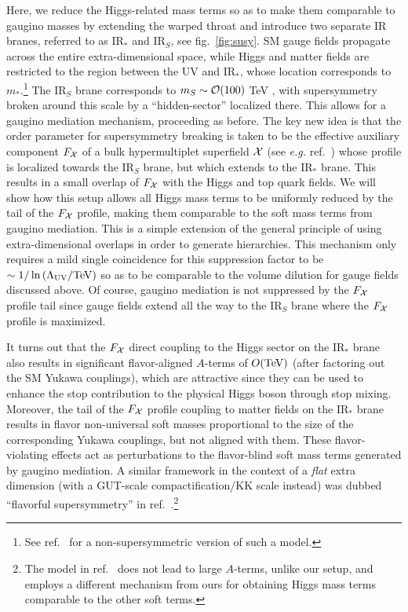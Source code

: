 \documentclass[a4paper,12pt]{article}
\def\fig#1{fig.~\ref{#1}}
\def\fig#1{fig.~\ref{#1}}
\def\LUV{\Lambda_{\rm UV}}
\def\mst{m_*}
\def\mS{m_S}
\begin{document}
Here, we reduce the Higgs-related mass terms so as to make them comparable to gaugino masses by extending the warped throat and introduce two separate IR branes, referred to as IR$_*$ and IR$_S$, see \fig{fig:susy}. SM gauge fields propagate across the entire extra-dimensional space, while Higgs and matter fields are restricted to the region between the UV and IR$_*$, whose location corresponds to
$\mst$.\footnote{See ref.~\cite{Agashe:2016rle} for a non-supersymmetric version of such a model.}
The IR$_S$ brane corresponds to $\mS \sim {\cal O}(100)$ TeV , with supersymmetry broken around this scale by a ``hidden-sector'' localized there. This allows for a gaugino mediation mechanism, proceeding as before.
The 
key new idea is that the order parameter for supersymmetry breaking is taken to be the effective auxiliary component $F_{\cal X}$  of a bulk hypermultiplet superfield ${\cal X}$ (see {\it e.g.} ref.~\cite{Arkani-Hamed:2001vvu}) whose  profile 
 is localized towards the IR$_S$ brane, 
but which extends to the IR$_*$ brane. This results in a small overlap of $F_{\cal X}$ 
with the Higgs and top quark fields.
We will show how this setup allows all Higgs mass terms to be uniformly reduced by the tail of the $F_{\cal X}$ profile, 
making them 
comparable to the soft mass terms from gaugino mediation. 
This is a simple extension of the general principle of using extra-dimensional overlaps in order to 
generate hierarchies.
This mechanism only requires a mild single coincidence for this suppression factor to be 
$\sim 1 / \ln \left( \LUV / \hbox{TeV} \right)$ so as to be comparable to the volume dilution for 
gauge fields discussed above.
Of course, 
gaugino mediation is not suppressed by the $F_{\cal X}$ profile tail since gauge fields extend all
 the way to the IR$_S$ brane where the $F_{\cal X}$ profile is maximized.

It turns out that the $F_{\cal X}$ direct coupling to the Higgs sector on the IR$_*$ brane also results in significant flavor-aligned $A$-terms of $O( \hbox{TeV} )$ (after factoring out the SM Yukawa couplings), which are attractive since they can be used to enhance the stop contribution to the physical Higgs boson through stop mixing. 
Moreover, the tail of the $F_{\cal X}$ profile coupling
to matter fields on the IR$_*$ brane results in flavor non-universal 
soft masses proportional
to the size of the corresponding Yukawa couplings, but not aligned with them. These
flavor-violating effects act as perturbations to the flavor-blind soft mass terms generated
by gaugino mediation. 
A similar framework in the context of a {\em flat} extra dimension (with a GUT-scale 
compactification/KK scale instead) was dubbed ``flavorful supersymmetry'' 
in ref.~\cite{Nomura:2008pt}.\footnote{The model in ref.~\cite{Nomura:2008pt} does not lead to 
large $A$-terms, unlike our setup,   
and employs a different mechanism from ours for obtaining Higgs mass terms comparable 
to the other soft terms.}
\end{document}
